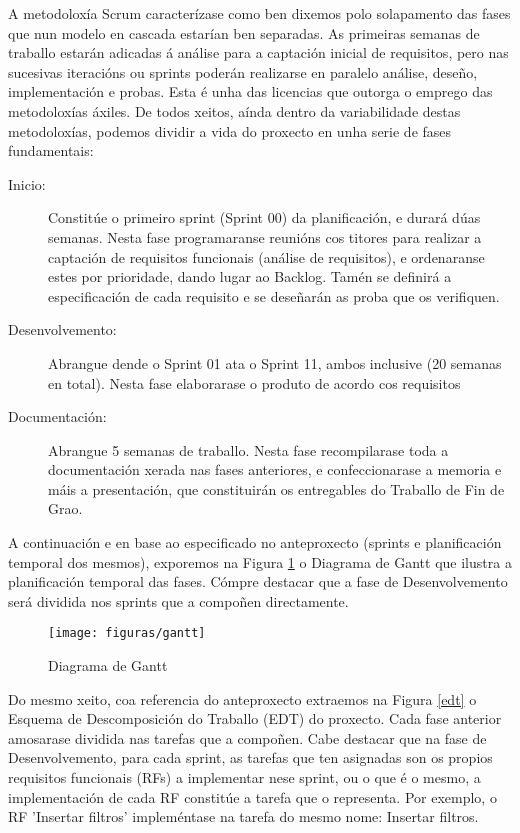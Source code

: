 A metodoloxía Scrum caracterízase como ben dixemos polo solapamento das fases que nun modelo en cascada estarían ben separadas. As primeiras semanas de traballo estarán adicadas á análise para a captación inicial de requisitos, pero nas sucesivas iteracións ou sprints poderán realizarse en paralelo análise, deseño, implementación e probas. Esta é unha das licencias que outorga o emprego das metodoloxías áxiles. De todos xeitos, aínda dentro da variabilidade destas metodoloxías, podemos dividir a vida do proxecto en unha serie de fases fundamentais:
\begin{description}
\item[Inicio:] Constitúe o primeiro sprint (Sprint 00) da planificación, e durará dúas semanas. Nesta fase programaranse reunións cos titores para realizar a captación de requisitos funcionais (análise de requisitos), e ordenaranse estes por prioridade, dando lugar ao Backlog. Tamén se definirá a especificación de cada requisito e se deseñarán as proba que os verifiquen.
\item[Desenvolvemento:] Abrangue dende o Sprint 01 ata o Sprint 11, ambos inclusive (20 semanas en total). Nesta fase elaborarase o produto de acordo cos requisitos
\item[Documentación:] Abrangue 5 semanas de traballo. Nesta fase recompilarase toda a documentación xerada nas fases anteriores, e confeccionarase a memoria e máis a presentación, que constituirán os entregables do Traballo de Fin de Grao.
\end{description}

A continuación e en base ao especificado no anteproxecto (sprints e planificación temporal dos mesmos), exporemos na Figura \ref{gantt} o Diagrama de Gantt que ilustra a planificación temporal das fases. Cómpre destacar que a fase de Desenvolvemento será dividida nos sprints que a compoñen directamente.

\begin{figure}
\centering
\texttt{[image: figuras/gantt]}
\caption{Diagrama de Gantt}
\label{gantt}
\end{figure}

Do mesmo xeito, coa referencia do anteproxecto extraemos na Figura \ref{edt} o Esquema de Descomposición do Traballo (EDT) do proxecto. Cada fase anterior amosarase dividida nas tarefas que a compoñen. Cabe destacar que na fase de Desenvolvemento, para cada sprint, as tarefas que ten asignadas son os propios requisitos funcionais (RFs) a implementar nese sprint, ou o que é o mesmo, a implementación de cada RF constitúe a tarefa que o representa. Por exemplo, o RF 'Insertar filtros' impleméntase na tarefa do mesmo nome: Insertar filtros.

